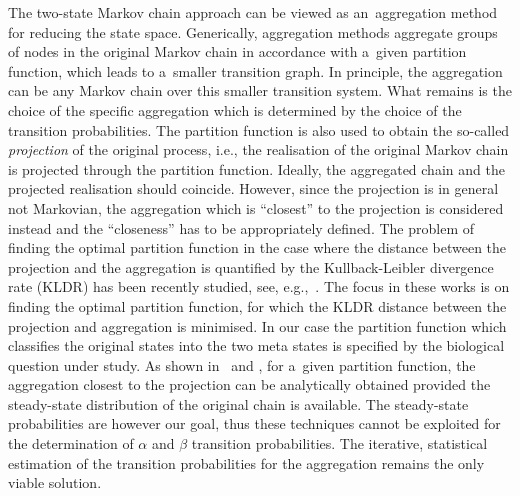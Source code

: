 \documentclass[runningheads,a4paper]{llncs}
\begin{document}
The two-state Markov chain approach can be viewed as an~aggregation method for reducing the state
space. Generically, aggregation methods aggregate groups of nodes in the original Markov chain in
accordance with a~given partition function, which leads to a~smaller transition graph. In
principle, the aggregation can be any Markov chain over this smaller transition system. What
remains is the choice of the specific aggregation which is determined by the choice of the
transition probabilities. The partition function is also used to obtain the so-called
\emph{projection} of the original process, i.e., the realisation of the original Markov chain is
projected through the partition function. Ideally, the aggregated chain and the projected
realisation should coincide. However, since the projection is in general not Markovian, the
aggregation which is ``closest'' to the projection is considered instead and the ``closeness'' has
to be appropriately defined. The problem of finding the optimal partition function in the case
where the distance between the projection and the aggregation is quantified by the
Kullback-Leibler divergence rate (KLDR) has been recently studied, see,
e.g.,~\cite{DMM09,DMM11,GPKK15}. The focus in these works is on finding the optimal partition
function, for which the KLDR distance between the projection and aggregation is minimised.
In our case the partition function which classifies the original states into the two meta states
is specified by the biological question under study. As shown in~\cite{DMM11} and \cite{GPKK15},
for a~given partition function, the aggregation closest to the projection can be analytically
obtained provided the steady-state distribution of the original chain is available. The
steady-state probabilities are however our goal, thus these techniques cannot be exploited for the
determination of $\alpha$ and $\beta$ transition probabilities. The iterative, statistical
estimation of the transition probabilities for the aggregation remains the only viable
solution.
\end{document}

